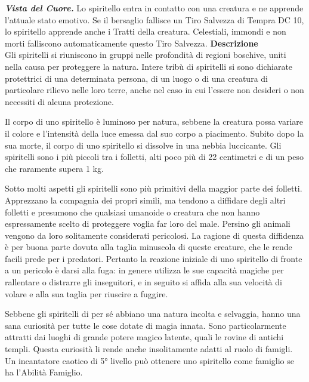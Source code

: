 \begin{multicols}{2}
{\emph{\textbf{Vista del Cuore.}} Lo spiritello entra in contatto con una creatura e ne apprende l'attuale stato emotivo. Se il bersaglio fallisce un Tiro Salvezza di Tempra DC 10, lo spiritello apprende anche i Tratti della creatura. Celestiali, immondi e non morti falliscono automaticamente questo Tiro Salvezza.
\textbf{Descrizione}\\
Gli spiritelli si riuniscono in gruppi nelle profondità di regioni boschive, uniti nella causa per proteggere la natura. Intere tribù di spiritelli si sono dichiarate protettrici di una determinata persona, di un luogo o di una creatura di particolare rilievo nelle loro terre, anche nel caso in cui l'essere non desideri o non necessiti di alcuna protezione.

Il corpo di uno spiritello è luminoso per natura, sebbene la creatura possa variare il colore e l'intensità della luce emessa dal suo corpo a piacimento. Subito dopo la sua morte, il corpo di uno spiritello si dissolve in una nebbia luccicante. Gli spiritelli sono i più piccoli tra i folletti, alti poco più di 22 centimetri e di un peso che raramente supera 1 kg.

Sotto molti aspetti gli spiritelli sono più primitivi della maggior parte dei folletti. Apprezzano la compagnia dei propri simili, ma tendono a diffidare degli altri folletti e presumono che qualsiasi umanoide o creatura che non hanno espressamente scelto di proteggere voglia far loro del male. Persino gli animali vengono da loro solitamente considerati pericolosi. La ragione di questa diffidenza è per buona parte dovuta alla taglia minuscola di queste creature, che le rende facili prede per i predatori. Pertanto la reazione iniziale di uno spiritello di fronte a un pericolo è darsi alla fuga: in genere utilizza le sue capacità magiche per rallentare o distrarre gli inseguitori, e in seguito si affida alla sua velocità di volare e alla sua taglia per riuscire a fuggire.

Sebbene gli spiritelli di per sé abbiano una natura incolta e selvaggia, hanno una sana curiosità per tutte le cose dotate di magia innata. Sono particolarmente attratti dai luoghi di grande potere magico latente, quali le rovine di antichi templi. Questa curiosità li rende anche insolitamente adatti al ruolo di famigli. Un incantatore caotico di 5° livello può ottenere uno spiritello come famiglio se ha l'Abilità Famiglio.

}
\end{multicols}

